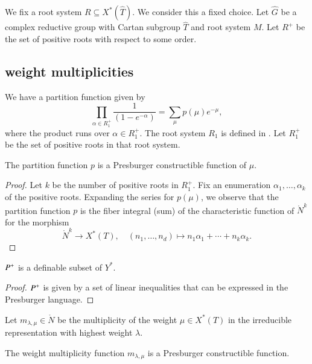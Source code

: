 
We fix a root system $R \subseteq X^*(\hat T)$.  We consider this a fixed choice.
Let $\hat G$ be a complex reductive group with Cartan subgroup $\hat T$ and
root system $M$.
Let $R^+$ be the set of positive roots with respect to some order.



\subsection{weight multiplicities}

We have a partition function given by
\[
\prod_{\alpha\in R_1^+}\frac{1}{ (1-e^{-\alpha})} = \sum_\mu p(\mu) e^{-\mu},
\]
where the product runs over $\alpha\in R_1^+$. 
The root system $R_1$ is defined in \cite[\S3.12]{chriss}.
Let $R_1^+$ be the set of positive roots in  that root system.

\begin{lemma}\label{lemma:partition}
The partition function $p$ is a Presburger constructible function of $\mu$.
\end{lemma}

\begin{proof} Let $k$ be the number of positive roots in $R_1^+$.
Fix an enumeration $\alpha_1,\ldots,\alpha_k$ of the positive roots.
Expanding the series for $p(\mu)$, we observe that
the partition function $p$ is the fiber integral (sum) of the characteristic function of $\ring{N}^k$
for the morphism
\[
\ring{N}^k\to X^*(T),\quad (n_1,\ldots,n_d) \mapsto n_1\alpha_1+\cdots+n_k\alpha_k.
\]
\end{proof}

\begin{lemma}
$P^+$ is a definable subset of $Y^*$.
\end{lemma}

\begin{proof}
$P^+$ is given by a set of linear inequalities that can be expressed in the Presburger language.
\end{proof}


Let $m_{\lambda,\mu}\in \ring{N}$ be the multiplicity of the weight $\mu\in X^*(T)$
in the irreducible representation with highest weight $\lambda$.


\begin{lemma}  The weight multiplicity function $m_{\lambda,\mu}$  is a Presburger constructible function.
\end{lemma}

